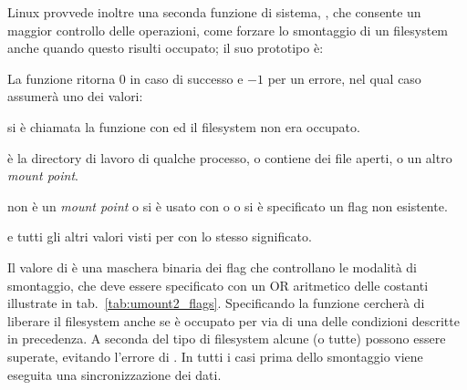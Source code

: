 Linux provvede inoltre una seconda funzione di sistema, , che
consente un maggior controllo delle operazioni, come forzare lo smontaggio di
un filesystem anche quando questo risulti occupato; il suo prototipo è:

\begin{funcproto}{
}
{La funzione ritorna  $0$ in caso di successo e $-1$ per un errore,
  nel qual caso  assumerà uno dei valori: 
  \begin{errlist}
     \item[\errcode{EAGAIN}] si è chiamata la funzione con 
       ed il filesystem non era occupato.
     \item[\errcode{EBUSY}]  è la directory di lavoro di qualche
       processo, o contiene dei file aperti, o un altro \textit{mount point}.
     \item[\errcode{EINVAL}]  non è un \textit{mount point} o si
       è usato  con  o
        o si è specificato un flag non esistente.
  \end{errlist}
  e tutti gli altri valori visti per  con lo stesso significato.}
\end{funcproto}

Il valore di  è una maschera binaria dei flag che controllano le
modalità di smontaggio, che deve essere specificato con un OR aritmetico delle
costanti illustrate in tab.~\ref{tab:umount2_flags}.  Specificando
 la funzione cercherà di liberare il filesystem anche se è
occupato per via di una delle condizioni descritte in precedenza. A seconda
del tipo di filesystem alcune (o tutte) possono essere superate, evitando
l'errore di . In tutti i casi prima dello smontaggio viene
eseguita una sincronizzazione dei dati.

